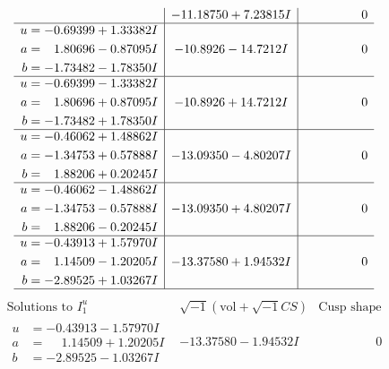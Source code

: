 \documentclass[1p]{elsarticle_modified}
\theoremstyle{definition}
\newcommand{\I}{\sqrt{-1}}
\begin{document}
$$\begin{array}{c|c|c}
 & -11.18750 + 7.23815 I & \phantom{-0.000000 } 0 \\ \hline\begin{aligned}
u &= -0.69399 + 1.33382 I \\
a &= \phantom{-}1.80696 - 0.87095 I \\
b &= -1.73482 - 1.78350 I\end{aligned}
 & -10.8926 - 14.7212 I & \phantom{-0.000000 } 0 \\ \hline\begin{aligned}
u &= -0.69399 - 1.33382 I \\
a &= \phantom{-}1.80696 + 0.87095 I \\
b &= -1.73482 + 1.78350 I\end{aligned}
 & -10.8926 + 14.7212 I & \phantom{-0.000000 } 0 \\ \hline\begin{aligned}
u &= -0.46062 + 1.48862 I \\
a &= -1.34753 + 0.57888 I \\
b &= \phantom{-}1.88206 + 0.20245 I\end{aligned}
 & -13.09350 - 4.80207 I & \phantom{-0.000000 } 0 \\ \hline\begin{aligned}
u &= -0.46062 - 1.48862 I \\
a &= -1.34753 - 0.57888 I \\
b &= \phantom{-}1.88206 - 0.20245 I\end{aligned}
 & -13.09350 + 4.80207 I & \phantom{-0.000000 } 0 \\ \hline\begin{aligned}
u &= -0.43913 + 1.57970 I \\
a &= \phantom{-}1.14509 - 1.20205 I \\
b &= -2.89525 + 1.03267 I\end{aligned}
 & -13.37580 + 1.94532 I & \phantom{-0.000000 } 0\\
 \hline 
 \end{array}$$\newpage$$\begin{array}{c|c|c}  
\text{Solutions to }I^u_{1}& \I (\text{vol} + \sqrt{-1}CS) & \text{Cusp shape}\\
 \hline 
\begin{aligned}
u &= -0.43913 - 1.57970 I \\
a &= \phantom{-}1.14509 + 1.20205 I \\
b &= -2.89525 - 1.03267 I\end{aligned}
 & -13.37580 - 1.94532 I & \phantom{-0.000000 } 0 \\ \hline\begin{aligned}

\end{aligned}
\end{array}$$
\end{document}
